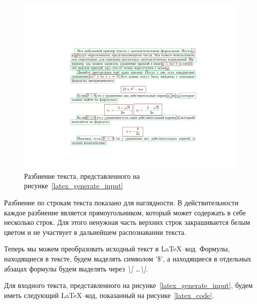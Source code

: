 \begin{figure}
    \includegraphics[scale=0.75]{img/latex_generation/segmented.jpg}
    \caption{Разбиение текста, представленного на рисунке~\ref{latex_generate_input}}
    \label{latex_segmentation}
\end{figure}

Разбиение по строкам текста показано для наглядности. В действительности каждое разбиение является прямоугольником, который может содержать в себе несколько строк. Для этого ненужная часть верхних строк закрашивается белым цветом и не участвует в дальнейшем распознавании текста.

Теперь мы можем преобразовать исходный текст в \LaTeX--код. Формулы, находящиеся в тексте, будем выделять символом '\$', а находящиеся в отдельных абзацах формулы будем выделять через \textit{\textbackslash [ \ldots \textbackslash]}.

Для входного текста, представленного на рисунке~\ref{latex_generate_input}, будем иметь следующий \LaTeX--код, показанный на рисунке~\ref{latex_code}.

